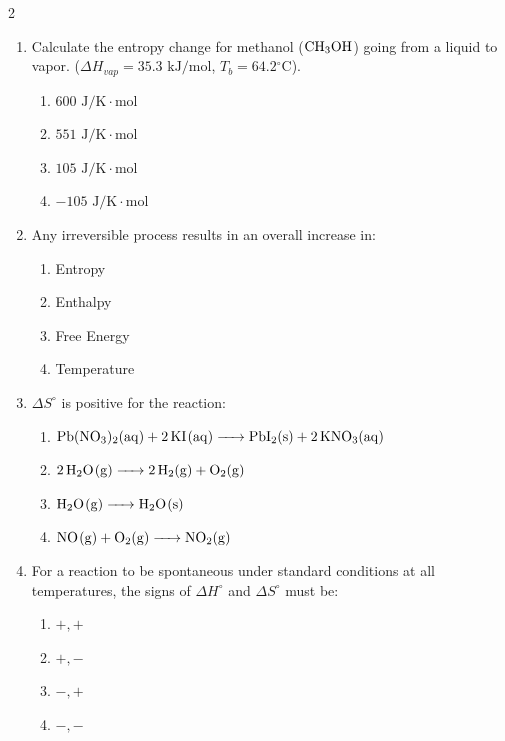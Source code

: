 \documentclass[12pt,letterpaper]{article}
\begin{document}
\begin{multicols*}{2}
\begin{enumerate}
        \item Calculate the entropy change for methanol ($\ce{CH3OH}$) going from a liquid to vapor. ($\Delta H_{vap} = 35.3\text{ kJ/mol}$, $T_b = 64.2\text{}^\circ\text{C}$). %
            \begin{enumerate}
                \item $600\text{ J/K}\cdot\text{mol}$
                \item $551\text{ J/K}\cdot\text{mol}$
                \item $105\text{ J/K}\cdot\text{mol}$
                \item $-105\text{ J/K}\cdot\text{mol}$
            \end{enumerate}
        \item Any irreversible process results in an overall increase in: %
            \begin{enumerate}
                \item Entropy
                \item Enthalpy
                \item Free Energy
                \item Temperature
            \end{enumerate}
        \item $\Delta S^\circ$ is positive for the reaction: %
            \begin{enumerate}
                \item $\ce{Pb(NO3)2(aq) + 2KI(aq) -> PbI2(s) + 2KNO3(aq)}$
                \item $\ce{2H2O(g) -> 2H2(g) + O2(g)}$
                \item $\ce{H2O(g) -> H2O(s)}$
                \item $\ce{NO(g) + O2(g) -> NO2(g)}$
            \end{enumerate}

        \item For a reaction to be spontaneous under standard conditions at all temperatures, the signs of $\Delta H^\circ$ and $\Delta S^\circ$ must be: %
            \begin{enumerate}
                \item $+, +$
                \item $+, -$
                \item $-, +$
                \item $-, -$
            \end{enumerate}


\end{enumerate}
\end{multicols*}
\end{document}

